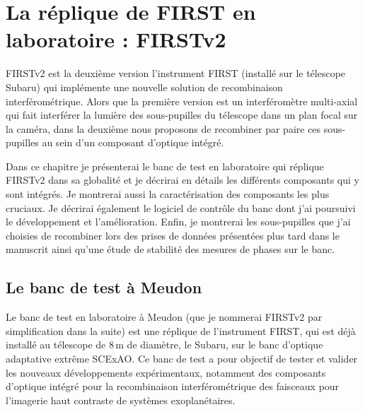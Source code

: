 \newpage\thispagestyle{empty}
\chapter{La réplique de FIRST en laboratoire : FIRSTv2}
\label{sec:FIRSTv2Concept}
\setcounter{figure}{0}
\setcounter{table}{0}
\setcounter{equation}{0}

\begingroup
\hypersetup{linkcolor=black}
\minitoc
\endgroup

\clearpage
\ac{FIRSTv2} est la deuxième version l'instrument \ac{FIRST} (installé sur le télescope Subaru) qui implémente une nouvelle solution de recombinaison interférométrique. Alors que la première version est un interféromètre multi-axial qui fait interférer la lumière des sous-pupilles du télescope dans un plan focal sur la caméra, dans la deuxième nous proposons de recombiner par paire ces sous-pupilles au sein d'un composant d'optique intégré.

Dans ce chapitre je présenterai le banc de test en laboratoire qui réplique \ac{FIRSTv2} dans sa globalité et je décrirai en détails les différents composants qui y sont intégrés. Je montrerai aussi la caractérisation des composants les plus cruciaux. Je décrirai également le logiciel de contrôle du banc dont j'ai poursuivi le développement et l'amélioration. Enfin, je montrerai les sous-pupilles que j'ai choisies de recombiner lors des prises de données présentées plus tard dans le manuscrit ainsi qu'une étude de stabilité des mesures de phases sur le banc.


\section{Le banc de test à Meudon}

Le banc de test en laboratoire à Meudon (que je nommerai \ac{FIRSTv2} par simplification dans la suite) est une réplique de l'instrument \ac{FIRST}, qui est déjà installé au télescope de $8 \,$m de diamètre, le Subaru, sur le banc d'optique adaptative extrême \ac{SCExAO}. Ce banc de test a pour objectif de tester et valider les nouveaux développements expérimentaux, notamment des composants d'optique intégré pour la recombinaison interférométrique des faisceaux pour l'imagerie haut contraste de systèmes exoplanétaires.

